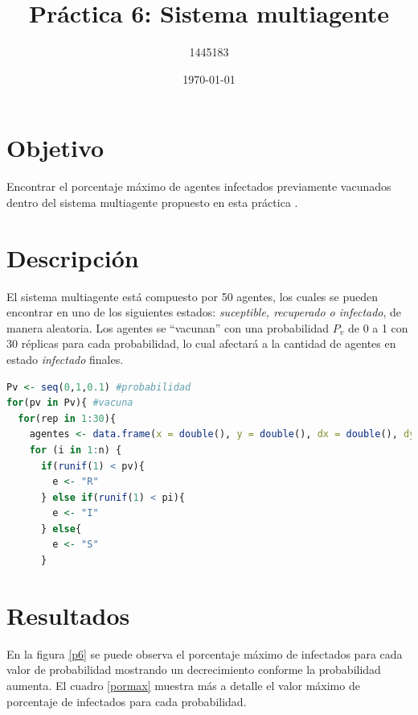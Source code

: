 \documentclass{article}
\author{1445183}
\title{Práctica 6: Sistema multiagente}
\date{\today}
\begin{document}
\maketitle

\section{Objetivo}
Encontrar el porcentaje máximo de agentes infectados previamente vacunados dentro del sistema multiagente propuesto en esta práctica \cite{elisaweb6}.

\section{Descripción}
El sistema multiagente está compuesto por 50 agentes, los cuales se pueden encontrar en uno de los siguientes estados: \textit{suceptible, recuperado  o infectado}, de manera aleatoria. Los agentes se ``vacunan'' con una probabilidad $P_{v}$ de 0 a 1 con 30 réplicas para cada probabilidad, lo cual afectará a la cantidad de agentes en estado \textit{infectado} finales. 

\begin{lstlisting}[language=R]
Pv <- seq(0,1,0.1) #probabilidad
for(pv in Pv){ #vacuna
  for(rep in 1:30){
    agentes <- data.frame(x = double(), y = double(), dx = double(), dy = double(), estado  = character(), amigo = NULL)
    for (i in 1:n) { 
      if(runif(1) < pv){ 
        e <- "R"
      } else if(runif(1) < pi){
        e <- "I"
      } else{
        e <- "S"
      }
\end{lstlisting}

\newpage


\section{Resultados}

En la figura \ref{p6} se puede observa el porcentaje máximo de infectados para cada valor de probabilidad mostrando un decrecimiento conforme la probabilidad aumenta. El cuadro \ref{pormax} muestra más a detalle el valor máximo de porcentaje de infectados para cada probabilidad.
\end{document}
